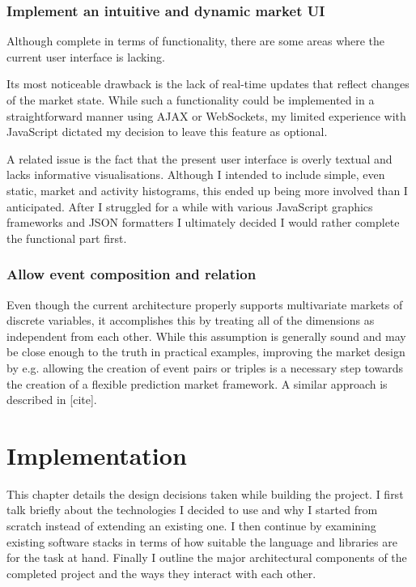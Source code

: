\documentclass[bsc,frontabs,twoside,singlespacing,parskip,deptreport]{infthesis}     %
\begin{document}
\subsection{Implement an intuitive and dynamic market UI}
    Although complete in terms of functionality, there are some areas where the current user interface is lacking.
    
    Its most noticeable drawback is the lack of real-time updates that reflect changes of the market state. While such a functionality could be implemented in a straightforward manner using AJAX or WebSockets, my limited experience with JavaScript dictated my decision to leave this feature as optional. 
    
    A related issue is the fact that the present user interface is overly textual and lacks informative visualisations. Although I intended to include simple, even static, market and activity histograms, this ended up being more involved than I anticipated. After I struggled for a while with various JavaScript graphics frameworks and JSON formatters I ultimately decided I would rather complete the functional part first.  

\subsection{Allow event composition and relation}

    Even though the current architecture properly supports multivariate markets of discrete variables, it accomplishes this by treating all of the dimensions as independent from each other. While this assumption is generally sound and may be close enough to the truth in practical examples, improving the market design by e.g. allowing the creation of event pairs or triples is a necessary step towards the creation of a flexible prediction market framework. A similar approach is described in [cite]. 
    

\chapter{Implementation}

    This chapter details the design decisions taken while building the project. I first talk briefly about the technologies I decided to use and why I started from scratch instead of extending an existing one. I then continue by examining existing software stacks in terms of how suitable the language and libraries are for the task at hand. Finally I outline the major architectural components of the completed project and the ways they interact with each other.
\end{document}

